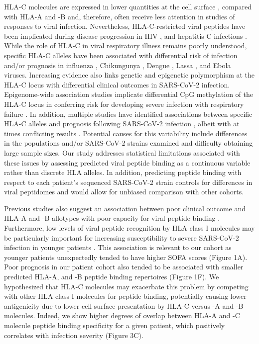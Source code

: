 \documentclass[utf8]{frontiersinFPHY_FAMS} %
\begin{document}
HLA-C molecules are expressed in lower quantities at the cell surface \citep{332508, 1383381, 332508, 2967765, 7760000}, compared with HLA-A and -B and, therefore, often receive less attention in studies of responses to viral infection.   Nevertheless, HLA-C-restricted viral peptides have been implicated during disease progression in HIV \citep{21814282, 22807681, 26575988, 24785948, 27880898, 32501836}, and hepatitis C infections \citep{27057987}. While the role of HLA-C in viral respiratory illness remains poorly understood, specific  HLA-C alleles have been associated with differential risk of infection and/or prognosis in influenza \citep{18246204, 22216211, 31191533}, Chikungunya \citep{21966274}, Dengue \citep{25264760}, Lassa \citep{30711514}, and Ebola \citep{20878400, 33350932, 28558022} viruses. Increasing evidence also links genetic and epigenetic polymorphism at the HLA-C locus with differential clinical outcomes in SARS-CoV-2 infection. Epigenome-wide association studies implicate differential CpG methylation of the HLA-C locus in conferring risk for developing severe infection with respiratory failure \citep{33867313}. In addition, multiple studies have identified associations between specific HLA-C alleles and prognosis following SARS-CoV-2 infection \citep{34352002, 35874712, 33233780, 34352002, 35874712, 33233780, 37468623, 37112884, 36627290},  albeit with at times conflicting results \cite{36534127, 38251811}. Potential causes for this variability include differences in the populations and/or SARS-CoV-2 strains examined and difficulty obtaining large sample sizes. Our study addresses statistical limitations associated with these issues by assessing predicted viral peptide binding as a continuous variable rather than discrete HLA alleles. In addition, predicting peptide binding with respect to each patient's sequenced SARS-CoV-2 strain controls for differences in viral peptidomes and would allow for unbiased comparison with other cohorts.       

Previous studies also suggest an association between poor clinical outcome and HLA-A and -B allotypes with poor capacity for viral peptide binding \citep{33968060, 33298875}. Furthermore, low levels of viral peptide recognition by HLA class I molecules may be particularly important for increasing susceptibility to severe SARS-CoV-2 infection in younger patients \citep{35911710}. This association is relevant to our cohort as younger patients unexpectedly tended to have higher SOFA scores (Figure 1A). Poor prognosis in our patient cohort also tended to be associated with smaller predicted HLA-A, and -B peptide binding repertoires (Figure 1F). We hypothesized that HLA-C molecules may exacerbate this problem by competing with other HLA class I molecules for peptide binding, potentially causing lower antigenicity due to lower cell surface presentation by HLA-C versus -A and -B molecules. Indeed, we show higher degrees of overlap between HLA-A and -C molecule peptide binding specificity for a given patient, which positively correlates with infection severity (Figure 3C). 
\end{document}
